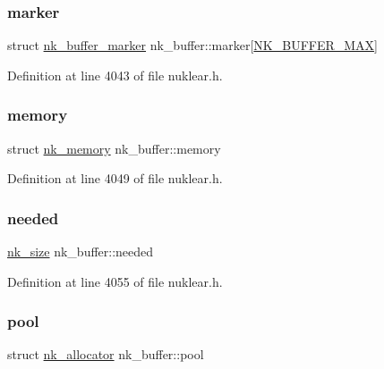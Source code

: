 \subsubsection{\texorpdfstring{marker}{marker}}
{\footnotesize\ttfamily struct \mbox{\hyperlink{structnk__buffer__marker}{nk\+\_\+buffer\+\_\+marker}} nk\+\_\+buffer\+::marker\mbox{[}\mbox{\hyperlink{nuklear_8h_add31ad7a49e91bcf491614a4739108c1ab0dfe51211ba806cb36a3a6b1f3e76bd}{N\+K\+\_\+\+B\+U\+F\+F\+E\+R\+\_\+\+M\+AX}}\mbox{]}}



Definition at line 4043 of file nuklear.\+h.

\mbox{\label{structnk__buffer_a228b585debec1d328859fb52080ca3fd}} 
\subsubsection{\texorpdfstring{memory}{memory}}
{\footnotesize\ttfamily struct \mbox{\hyperlink{structnk__memory}{nk\+\_\+memory}} nk\+\_\+buffer\+::memory}



Definition at line 4049 of file nuklear.\+h.

\mbox{\label{structnk__buffer_a6b0ea49209eaba5285b715d902c5f446}} 
\subsubsection{\texorpdfstring{needed}{needed}}
{\footnotesize\ttfamily \mbox{\hyperlink{nuklear_8h_a84c0fc50dec5501be327b33d41d9010c}{nk\+\_\+size}} nk\+\_\+buffer\+::needed}



Definition at line 4055 of file nuklear.\+h.

\mbox{\label{structnk__buffer_a0cd2b90bb2994190fa1aa0e9ffbc1184}} 
\subsubsection{\texorpdfstring{pool}{pool}}
{\footnotesize\ttfamily struct \mbox{\hyperlink{structnk__allocator}{nk\+\_\+allocator}} nk\+\_\+buffer\+::pool}



